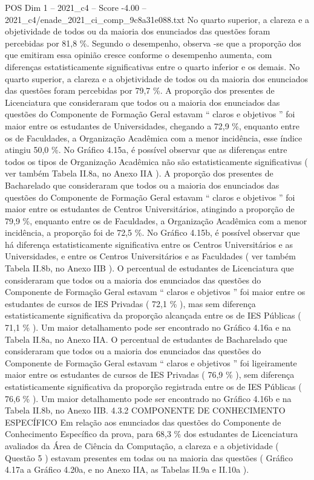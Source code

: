 \begin{textsample}{POS Dim 1 – 2021\_c4 – Score -4.00 – 2021\_c4/enade\_2021\_ci\_comp\_9c8a31e088.txt}
No quarto superior, a clareza e a objetividade de todos ou da maioria dos enunciados das questões foram percebidas por 81,8 \%.
Segundo o desempenho, observa -se que a proporção dos que emitiram essa opinião cresce conforme o desempenho aumenta, com diferenças estatisticamente significativas entre o quarto inferior e os demais.
No quarto superior, a clareza e a objetividade de todos ou da maioria dos enunciados das questões foram percebidas por 79,7 \%.
A proporção dos presentes de Licenciatura que consideraram que todos ou a maioria dos enunciados das questões do Componente de Formação Geral estavam “ claros e objetivos ” foi maior entre os estudantes de Universidades, chegando a 72,9 \%, enquanto entre os de Faculdades, a Organização Acadêmica com a menor incidência, esse índice atingiu 50,0 \%.
No Gráfico 4.15a, é possível observar que as diferenças entre todos os tipos de Organização Acadêmica não são estatisticamente significativas ( ver também Tabela II.8a, no Anexo IIA ).
A proporção dos presentes de Bacharelado que consideraram que todos ou a maioria dos enunciados das questões do Componente de Formação Geral estavam “ claros e objetivos ” foi maior entre os estudantes de Centros Universitários, atingindo a proporção de 79,9 \%, enquanto entre os de Faculdades, a Organização Acadêmica com a menor incidência, a proporção foi de 72,5 \%.
No Gráfico 4.15b, é possível observar que há diferença estatisticamente significativa entre os Centros Universitários e as Universidades, e entre os Centros Universitários e as Faculdades ( ver também Tabela II.8b, no Anexo IIB ).
O percentual de estudantes de Licenciatura que consideraram que todos ou a maioria dos enunciados das questões do Componente de Formação Geral estavam “ claros e objetivos ” foi maior entre os estudantes de cursos de IES Privadas ( 72,1 \% ), mas sem diferença estatisticamente significativa da proporção alcançada entre os de IES Públicas ( 71,1 \% ).
Um maior detalhamento pode ser encontrado no Gráfico 4.16a e na Tabela II.8a, no Anexo IIA.
O percentual de estudantes de Bacharelado que consideraram que todos ou a maioria dos enunciados das questões do Componente de Formação Geral estavam “ claros e objetivos ” foi ligeiramente maior entre os estudantes de cursos de IES Privadas ( 76,9 \% ), sem diferença estatisticamente significativa da proporção registrada entre os de IES Públicas ( 76,6 \% ).
Um maior detalhamento pode ser encontrado no Gráfico 4.16b e na Tabela II.8b, no Anexo IIB. 4.3.2 COMPONENTE DE CONHECIMENTO ESPECÍFICO Em relação aos enunciados das questões do Componente de Conhecimento Específico da prova, para 68,3 \% dos estudantes de Licenciatura avaliados da Área de Ciência da Computação, a clareza e a objetividade ( Questão 5 ) estavam presentes em todas ou na maioria das questões ( Gráfico 4.17a a Gráfico 4.20a, e no Anexo IIA, as Tabelas II.9a e II.10a ).

\end{textsample}
